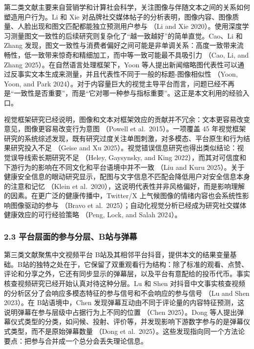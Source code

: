 \documentclass[
  fontset=none]{ctexart}
\begin{document}
第二类文献主要来自营销学和计算社会科学，关注图像与伴随文本之间的关系如何塑造用户行为。Li 和 Xie 对品牌社交媒体帖子的分析表明，图像内容、图像质量、人脸出现和图文匹配都能独立预测用户参与 （Li and Xie 2020）。使用深度学习测量图文一致性的后续研究则复杂化了``越一致越好''的简单直觉。Cao、Li 和 Zhang 发现，图文一致性与消费者偏好之间可能是非单调关系：高度一致带来流畅性，低一致带来惊奇和精细加工，而中等一致可能最不具吸引力 （Cao, Li, and Zhang 2025）。在自然语言处理框架下，Yoon 等人提出新闻缩略图代表性可以通过反事实文本生成来测量，并且代表性不同于一般的标题-图像相似性 （Yoon, Yoon, and Park 2024）。对于内容量巨大的视觉主导平台而言，问题已经不再是``一致性是否重要''，而是``它对哪一种参与指标重要''。这正是本文利用的经验入口。

视觉框架研究已经说明，图像和文本对框架效应的贡献并不冗余：文本更容易改变意见，图像更容易改变行为意图 （Powell et al.~2015）。一项覆盖 45 年视觉框架研究的系统综述发现，既有研究过度关注单图刺激，对多模态、平台原生和行为结果研究投入不足 （Geise and Xu 2025）。视觉错误信息研究也得出类似结论：视觉误导线索长期研究不足 （Heley, Gaysynsky, and King 2022），而其对可信度和下游行为的影响在不同文化和平台语境中并不一致 （Liu and Kuru 2025）。关于健康安全信息的眼动研究显示，配图与文字信息不匹配会降低用户对安全信息本身的注意和记忆 （Klein et al.~2020），这说明代表性并非风格偏好，而是影响理解的因素。在更广泛的健康传播中，Twitter/X 上气候图像的情绪内容也会系统性影响图像驱动的参与 （Bravo et al.~2025）；自动化视觉分析已经成为研究社交媒体健康效应的可行经验策略 （Peng, Lock, and Salah 2024）。

\subsubsection{2.3 平台层面的参与分层、B站与弹幕}\label{ux5e73ux53f0ux5c42ux9762ux7684ux53c2ux4e0eux5206ux5c42bux7ad9ux4e0eux5f39ux5e55}

第三类文献聚焦中文视频平台 B站及其相邻平台抖音，提供本文的结果变量基础。B站的独特之处在于，它保留了双重观看行为结构：除了标准的观看、点赞、评论和分享之外，它还有同步显示的弹幕层，以及平台有意配给的投币代币。事实核查视频研究已经开始认真对待这种分层。Lu 和 Shen 对抖音中文事实核查视频的分析区分了会响应多模态特征的参与信号和不会响应的参与信号 （Lu and Shen 2023）。在 B站语境中，Chen 发现弹幕互动由不同于评论量的内容特征预测，这说明弹幕在参与层级中占据行为上不同的位置 （Chen 2025）。Dong 等人提出弹幕仪式类型的分类，如问候、投射、评价等，并发现影响下游数字参与的是弹幕仪式类型，而不是原始弹幕数量 （Dong et al.~2025）。这些发现指向同一个方法论要点：把参与合并成一个总分会丢失理论信息。
\end{document}
